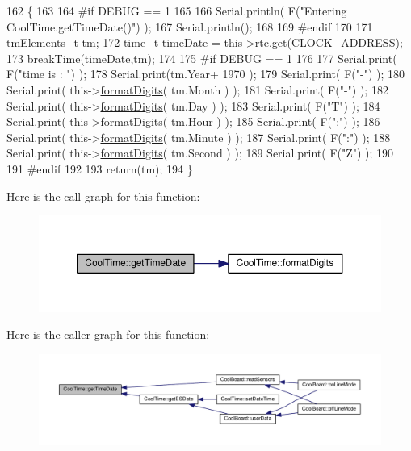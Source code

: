 \begin{DoxyCode}
162 \{
163 
164 \textcolor{preprocessor}{#if DEBUG == 1 }
165     
166     Serial.println( F(\textcolor{stringliteral}{"Entering CoolTime.getTimeDate()"}) );
167     Serial.println();
168 
169 \textcolor{preprocessor}{#endif}
170 
171     tmElements\_t tm;
172     time\_t timeDate = this->\hyperlink{class_cool_time_abd38f2384ff90692b1568d9db869412e}{rtc}.get(CLOCK\_ADDRESS);
173     breakTime(timeDate,tm);
174 
175 \textcolor{preprocessor}{#if DEBUG == 1}
176     
177     Serial.print( F(\textcolor{stringliteral}{"time is : "}) );
178     Serial.print(tm.Year+ 1970 );
179     Serial.print( F(\textcolor{stringliteral}{"-"}) );
180     Serial.print( this->\hyperlink{class_cool_time_acd537cd4210d7bde4e1f5c47d2ac0456}{formatDigits}( tm.Month ) );
181     Serial.print( F(\textcolor{stringliteral}{"-"}) );
182     Serial.print( this->\hyperlink{class_cool_time_acd537cd4210d7bde4e1f5c47d2ac0456}{formatDigits}( tm.Day ) );
183     Serial.print( F(\textcolor{stringliteral}{"T"}) );
184     Serial.print( this->\hyperlink{class_cool_time_acd537cd4210d7bde4e1f5c47d2ac0456}{formatDigits}( tm.Hour ) );
185     Serial.print( F(\textcolor{stringliteral}{":"}) );
186     Serial.print( this->\hyperlink{class_cool_time_acd537cd4210d7bde4e1f5c47d2ac0456}{formatDigits}( tm.Minute ) );
187     Serial.print( F(\textcolor{stringliteral}{":"}) );
188     Serial.print( this->\hyperlink{class_cool_time_acd537cd4210d7bde4e1f5c47d2ac0456}{formatDigits}( tm.Second ) );
189     Serial.print( F(\textcolor{stringliteral}{"Z"}) );
190 
191 \textcolor{preprocessor}{#endif}
192     
193     \textcolor{keywordflow}{return}(tm);
194 \}
\end{DoxyCode}
Here is the call graph for this function\+:\nopagebreak
\begin{figure}[H]
\begin{center}
\leavevmode
\includegraphics[width=350pt]{d6/d49/class_cool_time_a7a7501c5ca77dd1248bea704c44f986c_cgraph}
\end{center}
\end{figure}
Here is the caller graph for this function\+:\nopagebreak
\begin{figure}[H]
\begin{center}
\leavevmode
\includegraphics[width=350pt]{d6/d49/class_cool_time_a7a7501c5ca77dd1248bea704c44f986c_icgraph}
\end{center}
\end{figure}
